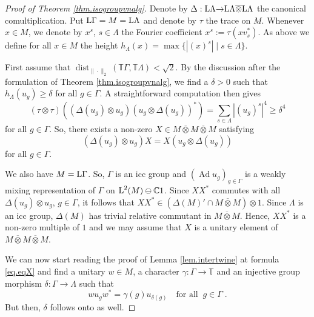 \documentclass[a4paper,11pt]{amsart}
\numberwithin{equation}{section}
\begin{document}
\begin{proof}[Proof of Theorem \ref{thm.isogroupvnalg}]
Denote by ${\Delta} : {\mathord{\text{\rm L}}} \Lambda {\rightarrow} {\mathord{\text{\rm L}}} \Lambda {\mathbin{\overline{\otimes}}} {\mathord{\text{\rm L}}} \Lambda$ the canonical comultiplication. Put ${\mathord{\text{\rm L}}} \Gamma = M = {\mathord{\text{\rm L}}} \Lambda$ and denote by $\tau$ the trace on $M$. Whenever $x \in M$, we denote by $x^s$, $s \in \Lambda$ the Fourier coefficient $x^s := \tau(x v_s^*)$. As above we define for all $x \in M$ the height $h_\Lambda(x) = \max \{ |(x)^s| \mid s \in \Lambda \}$.

First assume that ${\operatorname{dist}_{\|\cdot\|_2}}({\mathbb{T}} \Gamma,{\mathbb{T}} \Lambda) < \sqrt{2}$.
By the discussion after the formulation of Theorem \ref{thm.isogroupvnalg}, we find a $\delta > 0$ such that $h_\Lambda(u_g) {\geqslant} \delta$ for all $g \in \Gamma$. A straightforward computation then gives
$$(\tau {\otimes} \tau)( ({\Delta}(u_g) {\otimes} u_g) (u_g {\otimes} {\Delta}(u_g))^*) = \sum_{s \in \Lambda} |(u_g)^s|^4 {\geqslant} \delta^4$$
for all $g \in \Gamma$. So, there exists a non-zero $X \in M {\mathbin{\overline{\otimes}}} M {\mathbin{\overline{\otimes}}} M$ satisfying
$$({\Delta}(u_g) {\otimes} u_g) X = X (u_g {\otimes} {\Delta}(u_g))$$
for all $g \in \Gamma$.

We also have $M = {\mathord{\text{\rm L}}} \Gamma$. So, $\Gamma$ is an icc group and $({\operatorname{Ad}} u_g)_{g \in \Gamma}$ is a weakly mixing representation of $\Gamma$ on ${\mathord{\text{\rm L}}}^2(M) \ominus {\mathbb{C}} 1$. Since $XX^*$ commutes with all ${\Delta}(u_g) {\otimes} u_g$, $g \in \Gamma$, it follows that $XX^* \in ( {\Delta}(M)' \cap M {\mathbin{\overline{\otimes}}} M) {\otimes} 1$. Since $\Lambda$ is an icc group, ${\Delta}(M)$ has trivial relative commutant in $M {\mathbin{\overline{\otimes}}} M$. Hence, $XX^*$ is a non-zero multiple of $1$ and we may assume that $X$ is a unitary element of $M {\mathbin{\overline{\otimes}}} M {\mathbin{\overline{\otimes}}} M$.

We can now start reading the proof of Lemma \ref{lem.intertwine} at formula \eqref{eq.eqX} and find a unitary $w \in M$, a character $\gamma : \Gamma {\rightarrow} {\mathbb{T}}$ and an injective group morphism $\delta : \Gamma {\rightarrow} \Lambda$ such that
$$w u_g w^* = \gamma(g) u_{\delta(g)} \quad\text{for all}\;\; g \in \Gamma \; .$$
But then, $\delta$ follows onto as well.


\end{proof}
\end{document}
